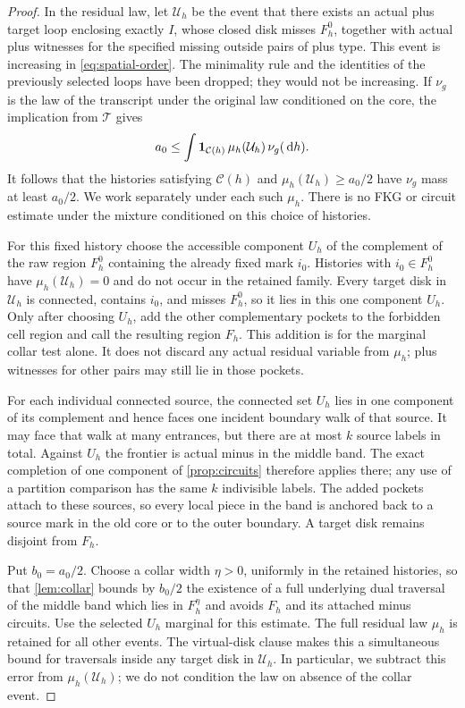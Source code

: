 \begin{proof}
In the residual law, let $\mathcal U_h$ be the event that there
exists an actual plus target loop enclosing exactly $I$, whose
closed disk misses $F_h^0$, together with actual plus witnesses
for the specified missing outside pairs of plus type. This event
is increasing in \eqref{eq:spatial-order}. The minimality rule and
the identities of the previously selected loops have been dropped;
they would not be increasing. If $\nu_g$ is the law of the
transcript under the original law conditioned on the core, the implication
from $\mathcal T$ gives
\[
 a_0\le\int \mathbf 1_{\mathcal C(h)}\,
                  \mu_h(\mathcal U_h)\,\nu_g(\,\mathrm d h).
\]
It follows that the histories satisfying $\mathcal C(h)$ and
$\mu_h(\mathcal U_h)\ge a_0/2$ have $\nu_g$ mass at least $a_0/2$.
We work separately under each such $\mu_h$. There is no FKG or
circuit estimate under the mixture conditioned on this choice of
histories.

For this fixed history choose the accessible component $U_h$ of
the complement of the raw region $F_h^0$ containing the already
fixed mark $i_0$. Histories with $i_0\in F_h^0$ have
$\mu_h(\mathcal U_h)=0$ and do not occur in the retained family.
Every target disk in $\mathcal U_h$ is connected, contains $i_0$,
and misses $F_h^0$, so it lies in this one component $U_h$.
Only after choosing $U_h$, add the other complementary pockets
to the forbidden cell region and call the resulting region $F_h$.
This addition is for the marginal collar test alone. It does not
discard any actual residual variable from $\mu_h$; plus witnesses
for other pairs may still lie in those pockets.

For each individual connected source, the connected set $U_h$
lies in one component of its complement and hence faces one
incident boundary walk of that source. It may face that walk at
many entrances, but there are at most $k$ source labels in total.
Against $U_h$ the frontier is actual minus in the middle band.
The exact completion of one component of \cref{prop:circuits} therefore
applies there; any use of a partition comparison has the same
$k$ indivisible labels. The added pockets attach to these sources,
so every local piece in the band is anchored back to a source mark
in the old core or to the outer boundary. A target disk remains
disjoint from $F_h$.

Put $b_0=a_0/2$. Choose a collar width $\eta>0$, uniformly in the
retained histories, so that \cref{lem:collar} bounds by $b_0/2$
the existence of a full underlying dual traversal of the middle
band which lies in $F_h^\eta$ and avoids $F_h$ and its attached
minus circuits. Use the selected $U_h$ marginal for this estimate.
The full residual law $\mu_h$ is retained for all other events.
The virtual-disk clause makes this a simultaneous bound for
traversals inside any target disk in $\mathcal U_h$. In particular,
we subtract this error from $\mu_h(\mathcal U_h)$; we do not
condition the law on absence of the collar event.


\end{proof}
